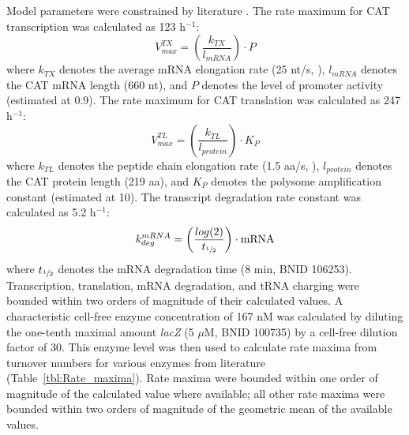 \documentclass[12pt]{article}
\begin{document}
Model parameters were constrained by literature \cite{Milo:2009aa}.
The rate maximum for CAT transcription was calculated as 123 h$^{-1}$:
\begin{equation}\label{eqn:transcription}
	V_{max}^{TX}=\left(\frac{k_{TX}}{l_{mRNA}}\right)\cdot P
\end{equation}
where $k_{TX}$ denotes the average mRNA elongation rate (25 nt/s, \cite{Garamella:2016aa}), $l_{mRNA}$ denotes the CAT mRNA length (660 nt), and $P$ denotes the level of promoter activity (estimated at 0.9).
The rate maximum for CAT translation was calculated as 247 h$^{-1}$:
\begin{equation}\label{eqn:transcription}
	V_{max}^{TL}=\left(\frac{k_{TL}}{l_{protein}}\right)\cdot K_P
\end{equation}
where $k_{TL}$ denotes the peptide chain elongation rate (1.5 aa/s, \cite{Garamella:2016aa}), $l_{protein}$ denotes the CAT protein length (219 aa), and $K_P$ denotes the polysome amplification constant (estimated at 10).
The transcript degradation rate constant was calculated as 5.2 h$^{-1}$:
\begin{equation}\label{eqn:transcription}
	k_{deg}^{mRNA}=\left(\frac{log(2)}{t_{\sfrac{1}{2}}}\right)\cdot{\rm mRNA}
\end{equation}
where $t_{\sfrac{1}{2}}$ denotes the mRNA degradation time (8 min, BNID 106253).
Transcription, translation, mRNA degradation, and tRNA charging were bounded within two orders of magnitude of their calculated values.
A characteristic cell-free enzyme concentration of 167 nM was calculated by diluting the one-tenth maximal amount \textit{lacZ} (5 $\mu$M, BNID 100735) by a cell-free dilution factor of 30.
This enzyme level was then used to calculate rate maxima from turnover numbers for various enzymes from literature (Table~\ref{tbl:Rate_maxima}).
Rate maxima were bounded within one order of magnitude of the calculated value where available; all other rate maxima were bounded within two orders of magnitude of the geometric mean of the available values.
\end{document}
